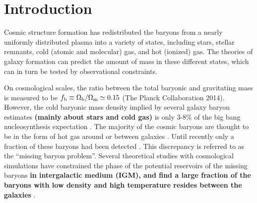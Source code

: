 \documentclass[useAMS,usenatbib]{mn2e}
\begin{document}
\setcounter{footnote}{1}


\section{Introduction}
\label{sec:intro}
Cosmic structure formation has redistributed the baryons from  a
nearly uniformly distributed plasma into a variety of states,
including stars, stellar remnants, cold (atomic and molecular) gas,
and hot (ionized) gas. The theories of galaxy formation can predict
the amount of mass in these different states, which can in turn be tested by
observational constraints.  

On cosmological scales, the ratio between the total baryonic and
gravitating mass is measured to be $f_{\rm b}\equiv \Omega_{\rm
  b}/\Omega_{\rm m}\simeq 0.15$ (The Planck Collaboration 2014).
However, the cold baryonic mass density implied by several galaxy baryon
estimates {\bf (mainly about stars and cold gas)} is only 3-8\% of 
the big bang nucleosynthesis expectation
\citep{Persic92, Fukugita98,  Bell03, McGaugh10}.  The majority of the
cosmic baryons are thought to be in the form of hot gas around or
between galaxies \citep{Cen09}. Until recently only a fraction of
these baryons had been detected \citep{Bregman07, Shull12}.  This
discrepancy is referred to as the ``missing baryon problem''.
Several theoretical studies with cosmological simulations
have constrained the phase of
the potential reservoirs of the missing baryons {\bf in intergalactic
medium (IGM), and find a large fraction of the baryons with low density
and high temperature resides between the galaxies}
\citep{Yoshida05, He05, Dave10, Zhu11, Haider16}.
\end{document}
